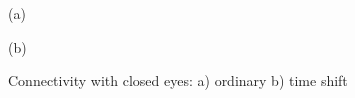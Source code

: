 \begin{figure}[h!]
\begin{minipage}[h]{0.49\linewidth}
 (a) \\
\end{minipage}
\hfill
\begin{minipage}[h]{0.5\linewidth}
 (b) \\
\end{minipage}
\caption{Connectivity with closed eyes: a) ordinary b) time shift} 
\end{figure}




